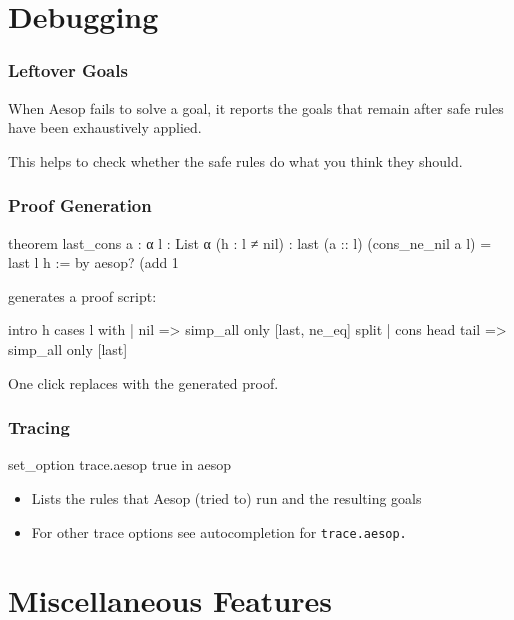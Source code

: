 \documentclass[xetex]{beamer}
\begin{document}
\section{Debugging}

\begin{frame}
  \frametitle{Leftover Goals}

  When Aesop fails to solve a goal, it reports the goals that remain
  after safe rules have been exhaustively applied.

  This helps to check whether the safe rules do what you think they should.
\end{frame}

\begin{frame}[fragile]
  \frametitle{Proof Generation}

  \begin{leancode}
    theorem last_cons {a : α} {l : List α} (h : l ≠ nil) :
        last (a :: l) (cons_ne_nil a l) = last l h := by
      aesop? (add 1%
  \end{leancode}

  \pause

   generates a proof script:

  \begin{leancode}
    intro h
    cases l with
    | nil =>
      simp_all only [last, ne_eq]
      split
    | cons head tail => simp_all only [last]
  \end{leancode}

  One click replaces  with the generated proof.
\end{frame}

\begin{frame}[fragile]
  \frametitle{Tracing}

  \begin{leancode}
    set_option trace.aesop true in
    aesop
  \end{leancode}

  \pause

  \begin{itemize}[<+->]
    \item Lists the rules that Aesop (tried to) run and the resulting goals
    \item For other trace options see autocompletion for \texttt{trace.aesop.}
  \end{itemize}
\end{frame}

\section{Miscellaneous Features}
\end{document}
